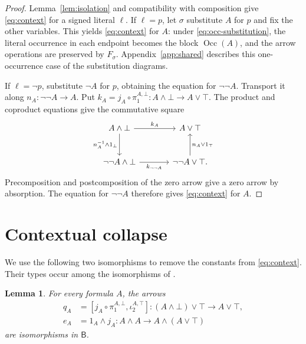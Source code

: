 \documentclass[11pt]{article}
\newtheorem{lemma}[theorem]{Lemma}
\newcommand{\B}{\mathsf B}
\newcommand{\Occ}{\operatorname{Occ}}
\begin{document}
\begin{proof}
Lemma~\ref{lem:isolation} and compatibility with composition give
\eqref{eq:context} for a signed literal $\ell$.
If $\ell=p$, let $\sigma$ substitute $A$ for $p$ and fix the other variables.
This yields \eqref{eq:context} for $A$: under
\eqref{eq:occ-substitution}, the literal occurrence in each endpoint
becomes the block $\Occ(A)$, and the arrow operations are preserved
by $F_\sigma$. Appendix~\ref{app:shared} describes this
one-occurrence case of the substitution diagrams.

If $\ell=\neg p$, substitute $\neg A$ for $p$, obtaining the equation
for $\neg\neg A$. Transport it along $n_A:\neg\neg A\to A$.
Put
$k_A=j_A\circ\pi_1^{A,\bot}:A\wedge\bot\to A\vee\top$.
The product and coproduct equations give the commutative square
\[
\begin{tikzcd}[column sep=large,row sep=large]
 A\wedge\bot\arrow[r,"k_A"]\arrow[d,"n_A^{-1}\wedge1_\bot"']
   &A\vee\top\\
 \neg\neg A\wedge\bot\arrow[r,"k_{\neg\neg A}"']
   &\neg\neg A\vee\top\arrow[u,"n_A\vee1_\top"'].
\end{tikzcd}
\]
Precomposition and postcomposition of the zero arrow give a zero
arrow by absorption. The equation for $\neg\neg A$ therefore gives
\eqref{eq:context} for $A$.
\end{proof}

\section{Contextual collapse}\label{sec:collapse}

We use the following two isomorphisms to remove the constants from
\eqref{eq:context}. Their types occur among the isomorphisms of
\cite[\S12.5, p.~294]{DP}.

\begin{lemma}\label{lem:structural-isos}
For every formula $A$, the arrows
\[
 \begin{aligned}
 q_A&=[j_A\circ\pi_1^{A,\bot},\iota_2^{A,\top}]
      :(A\wedge\bot)\vee\top\longrightarrow A\vee\top,\\
 e_A&=1_A\wedge j_A
      :A\wedge A\longrightarrow A\wedge(A\vee\top)
 \end{aligned}
\]
are isomorphisms in $\B$.
\end{lemma}
\end{document}

